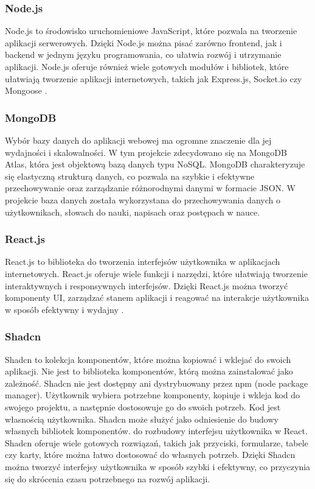 \subsubsection{Node.js}
Node.js to środowisko uruchomieniowe JavaScript, które pozwala na tworzenie aplikacji serwerowych. Dzięki Node.js można pisać zarówno frontend, jak i backend w jednym języku programowania, co ułatwia rozwój i utrzymanie aplikacji. Node.js oferuje również wiele gotowych modułów i bibliotek, które ułatwiają tworzenie aplikacji internetowych, takich jak Express.js, Socket.io czy Mongoose \cite{bugl2024modern}.

\subsubsection{MongoDB}
Wybór bazy danych do aplikacji webowej ma ogromne znaczenie dla jej wydajności i skalowalności. W tym projekcie zdecydowano się na MongoDB Atlas, która jest objektową bazą danych typu NoSQL. MongoDB charakteryzuje się elastyczną strukturą danych, co pozwala na szybkie i efektywne przechowywanie oraz zarządzanie różnorodnymi danymi w formacie JSON. W projekcie baza danych została wykorzystana do przechowywania danych o użytkownikach, słowach do nauki, napisach oraz postępach w nauce.

\subsubsection{React.js}
React.js to biblioteka do tworzenia interfejsów użytkownika w aplikacjach internetowych. React.js oferuje wiele funkcji i narzędzi, które ułatwiają tworzenie interaktywnych i responsywnych interfejsów. Dzięki React.js można tworzyć komponenty UI, zarządzać stanem aplikacji i reagować na interakcje użytkownika w sposób efektywny i wydajny \cite{dinku2022react}.

\subsubsection{Shadcn}
Shadcn to kolekcja komponentów, które można kopiować i wklejać do swoich aplikacji. Nie jest to biblioteka komponentów, którą można zainstalować jako zależność. Shadcn nie jest dostępny ani dystrybuowany przez npm (node package manager). Użytkownik wybiera potrzebne komponenty, kopiuje i wkleja kod do swojego projektu, a następnie dostosowuje go do swoich potrzeb. Kod jest własnością użytkownika. Shadcn może służyć jako odniesienie do budowy własnych bibliotek komponentów. do rozbudowy interfejsu użytkownika w React. Shadcn oferuje wiele gotowych rozwiązań, takich jak przyciski, formularze, tabele czy karty, które można łatwo dostosować do własnych potrzeb. Dzięki Shadcn można tworzyć interfejsy użytkownika w sposób szybki i efektywny, co przyczynia się do skrócenia czasu potrzebnego na rozwój aplikacji.







